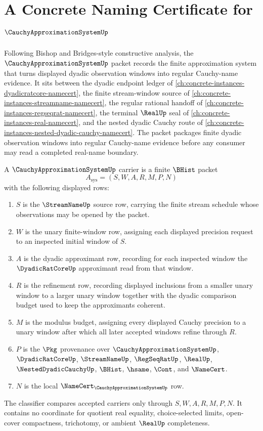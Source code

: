 \chapter{A Concrete Naming Certificate for $\CauchyApproximationSystemUp$}
\label{ch:concrete-instances-cauchy-approximation-system-namecert}

Following Bishop and Bridges-style constructive analysis, the $\CauchyApproximationSystemUp$ packet records the finite approximation system that turns displayed dyadic observation windows into regular Cauchy-name evidence. It sits between the dyadic endpoint ledger of \autoref{ch:concrete-instances-dyadicratcore-namecert}, the finite stream-window source of \autoref{ch:concrete-instances-streamname-namecert}, the regular rational handoff of \autoref{ch:concrete-instances-regseqrat-namecert}, the terminal $\RealUp$ seal of \autoref{ch:concrete-instances-real-namecert}, and the nested dyadic Cauchy route of \autoref{ch:concrete-instances-nested-dyadic-cauchy-namecert}. The packet packages finite dyadic observation windows into regular Cauchy-name evidence before any consumer may read a completed real-name boundary.

\begin{definition}
\label{def:cauchy-approximation-system-carrier}
A $\CauchyApproximationSystemUp$ carrier is a finite $\BHist$ packet
$$
A_{\mathrm{sys}}=(S,W,A,R,M,P,N)
$$
with the following displayed rows:
\begin{enumerate}
\item $S$ is the $\StreamNameUp$ source row, carrying the finite stream schedule whose observations may be opened by the packet.
\item $W$ is the unary finite-window row, assigning each displayed precision request to an inspected initial window of $S$.
\item $A$ is the dyadic approximant row, recording for each inspected window the $\DyadicRatCoreUp$ approximant read from that window.
\item $R$ is the refinement row, recording displayed inclusions from a smaller unary window to a larger unary window together with the dyadic comparison budget used to keep the approximants coherent.
\item $M$ is the modulus budget, assigning every displayed Cauchy precision to a unary window after which all later accepted windows refine through $R$.
\item $P$ is the $\Pkg$ provenance over $\CauchyApproximationSystemUp$, $\DyadicRatCoreUp$, $\StreamNameUp$, $\RegSeqRatUp$, $\RealUp$, $\NestedDyadicCauchyUp$, $\BHist$, $\hsame$, $\Cont$, and $\NameCert$.
\item $N$ is the local $\NameCert_{\CauchyApproximationSystemUp}$ row.
\end{enumerate}
The classifier compares accepted carriers only through $S,W,A,R,M,P,N$. It contains no coordinate for quotient real equality, choice-selected limits, open-cover compactness, trichotomy, or ambient $\RealUp$ completeness.
\end{definition}

